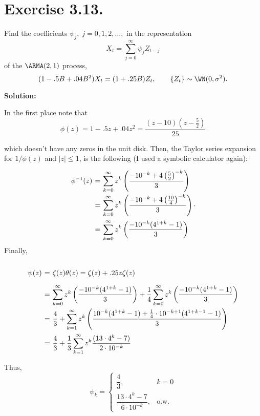 \section*{Exercise 3.13.}

Find the coefficients $\psi_j,\; j = 0,1,2,\ldots,$ in the representation 
\[ X_t = \sum_{j = 0}^{\infty} \psi_j Z_{t-j} \]
of the $\ARMA(2,1)$ process,
\[ (1-.5B+.04B^2) X_t = (1 + .25 B)Z_t,\hspace{2em}  \{Z_t\} \sim \WN(0,\sigma^2).\]

\textbf{Solution:}

In the first place note that
\[ \phi(z) = 1- .5z+.04 z^2 = \frac{\left(z - 10\right) \left(z - \frac{5}{2}\right)}{25} \]

which doesn't have any zeros in the unit disk. Then, the Taylor series expansion for $1/\phi(z)$ and $|z| \leq 1$, is the following (I used a symbolic calculator again):
\[ \everymath{\displaystyle}
\arraycolsep=1.8pt\def\arraystretch{2.5}
\begin{array}{rcl}
    \phi^{-1}(z) & = & \sum_{k=0}^{\infty} z^{k} \left(\frac{-10^{-k}+4\left(\frac{5}{2}\right)^{- k}}{3} \right)\\
    & = &\sum_{k=0}^{\infty} z^{k} \left(\frac{-10^{-k}+4\left(\frac{10}{4}\right)^{- k}}{3} \right)\\
    & = & \sum_{k=0}^{\infty} z^{k} \left(\frac{-10^{-k}(4^{1+k}-1)}{3} \right)
\end{array}. \]
Finally,
\[ \everymath{\displaystyle}
\arraycolsep=1.8pt\def\arraystretch{2.5}
\begin{array}{rcl}
    \psi(z) & = & \zeta(z) \theta(z) = \zeta(z) + .25 z \zeta(z)\\
    & = & \sum_{k=0}^{\infty} z^{k} \left(\frac{-10^{-k}(4^{1+k}-1)}{3} \right) + \frac{1}{4} \sum_{k=0}^{\infty} z^{k} \left(\frac{-10^{-k}(4^{1+k}-1)}{3} \right) \\
    & = & \frac{4}{3} + \sum_{k=1}^{\infty} z^{k} \left(\frac{10^{-k}(4^{1+k}-1) + \frac{1}{4}\cdot 10^{-k+1}(4^{1+k-1}-1)}{3} \right)\\
    & = & \frac{4}{3} + \frac{1}{3} \sum_{k=1}^{\infty} z^{k} \frac{(13\cdot 4^k - 7)}{2\cdot 10^{-k}}
\end{array} \]

Thus,
\[ \psi_k = \begin{cases}
    \dfrac{4}{3},& k = 0\\
    \dfrac{13\cdot 4^k - 7}{6\cdot 10^{-k}}, & \mbox{o.w.}
\end{cases} \]